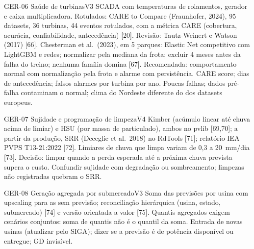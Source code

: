 \begin{ficha}{GER-06 \textperiodcentered{} Saúde de turbinas}{V3}
 SCADA com temperaturas de rolamentos, gerador e caixa
multiplicadora. Rotulados: CARE to Compare (Fraunhofer, 2024), 95 datasets, 36
turbinas, 44 eventos rotulados, com a métrica CARE (cobertura, acurácia,
confiabilidade, antecedência) [20].
 Revisão: Tautz-Weinert e Watson (2017) [66]. Chesterman et
al.\ (2023), em 5 parques: Elastic Net competitivo com LightGBM e redes;
normalizar pela mediana da frota; excluir 4 meses antes da falha do treino;
nenhuma família domina [67]. Recomendada: comportamento normal com
normalização pela frota e alarme com persistência.
 CARE score; dias de antecedência; falsos alarmes por turbina
por ano.
 Poucas falhas; dados pré-falha contaminam o normal; clima
do Nordeste diferente do dos datasets europeus.
\end{ficha}

\begin{ficha}{GER-07 \textperiodcentered{} Sujidade e programação de limpeza}{V4}
 Kimber (acúmulo linear até chuva acima de limiar) e HSU
(por massa de particulado), ambos no pvlib [69,70]; a partir da produção, SRR
(Deceglie et al.\ 2018) no RdTools [71]; relatório IEA PVPS T13-21:2022 [72].
Limiares de chuva que limpa variam de 0,3 a 20~mm/dia [73]. Decisão: limpar
quando a perda esperada até a próxima chuva prevista supera o custo.
 Confundir sujidade com degradação ou sombreamento;
limpezas não registradas quebram o SRR.
\end{ficha}

\begin{ficha}{GER-08 \textperiodcentered{} Geração agregada por submercado}{V3}
 Soma das previsões por usina com upscaling para as sem
previsão; reconciliação hierárquica (usina, estado, submercado) [74] e versão
orientada a valor [75]. Quantis agregados exigem cenários conjuntos: soma de
quantis não é o quantil da soma.
 Entrada de novas usinas (atualizar pelo SIGA); dizer se a
previsão é de potência disponível ou entregue; GD invisível.
\end{ficha}

